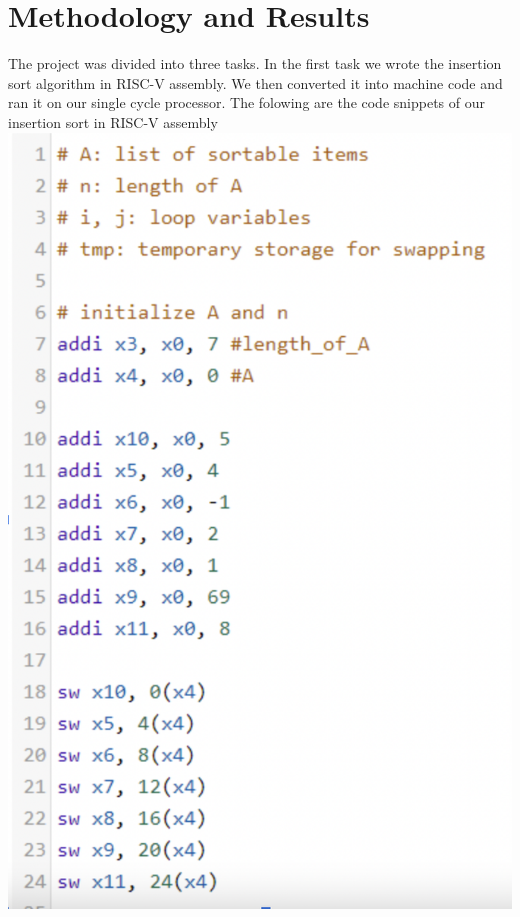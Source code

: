 \documentclass[a4paper, 12pt]{report}
\begin{document}
\section*{Methodology and Results}
The project was divided into three tasks. In the first task we wrote the insertion sort algorithm in RISC-V assembly. 
We then converted it into machine code and ran it on our single cycle processor. The folowing are the code snippets of our insertion sort in RISC-V assembly
\\\includegraphics[scale = 0.5]{is1.png}
\end{document}
